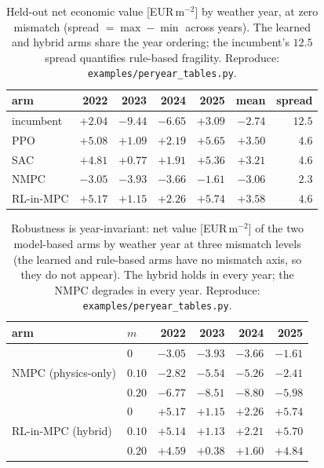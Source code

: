 \documentclass[11pt]{article}
\begin{document}
\begin{table}[t]
  \centering\small
  \caption{Held-out net economic value [EUR\,m$^{-2}$] by weather year, at zero mismatch (spread $=\max-\min$ across years). The learned and hybrid arms share the year ordering; the incumbent's $12.5$ spread quantifies rule-based fragility. Reproduce: \texttt{examples/peryear\_tables.py}.}
  \label{tab:peryear}
  \begin{tabular}{lrrrrrr}
    \toprule
    arm & 2022 & 2023 & 2024 & 2025 & mean & spread \\
    \midrule
    incumbent   & $+2.04$ & $-9.44$ & $-6.65$ & $+3.09$ & $-2.74$ & $12.5$ \\
    PPO         & $+5.08$ & $+1.09$ & $+2.19$ & $+5.65$ & $+3.50$ & $4.6$ \\
    SAC         & $+4.81$ & $+0.77$ & $+1.91$ & $+5.36$ & $+3.21$ & $4.6$ \\
    NMPC        & $-3.05$ & $-3.93$ & $-3.66$ & $-1.61$ & $-3.06$ & $2.3$ \\
    RL-in-MPC   & $+5.17$ & $+1.15$ & $+2.26$ & $+5.74$ & $+3.58$ & $4.6$ \\
    \bottomrule
  \end{tabular}
\end{table}

\begin{table}[t]
  \centering\small
  \caption{Robustness is year-invariant: net value [EUR\,m$^{-2}$] of the two model-based arms by weather year at three mismatch levels (the learned and rule-based arms have no mismatch axis, so they do not appear). The hybrid holds in every year; the NMPC degrades in every year. Reproduce: \texttt{examples/peryear\_tables.py}.}
  \label{tab:peryear-mismatch}
  \begin{tabular}{llrrrr}
    \toprule
    arm & $m$ & 2022 & 2023 & 2024 & 2025 \\
    \midrule
    \multirow{3}{*}{NMPC (physics-only)} & $0$    & $-3.05$ & $-3.93$ & $-3.66$ & $-1.61$ \\
                                         & $0.10$ & $-2.82$ & $-5.54$ & $-5.26$ & $-2.41$ \\
                                         & $0.20$ & $-6.77$ & $-8.51$ & $-8.80$ & $-5.98$ \\
    \midrule
    \multirow{3}{*}{RL-in-MPC (hybrid)}  & $0$    & $+5.17$ & $+1.15$ & $+2.26$ & $+5.74$ \\
                                         & $0.10$ & $+5.14$ & $+1.13$ & $+2.21$ & $+5.70$ \\
                                         & $0.20$ & $+4.59$ & $+0.38$ & $+1.60$ & $+4.84$ \\
    \bottomrule
  \end{tabular}
\end{table}
\end{document}
